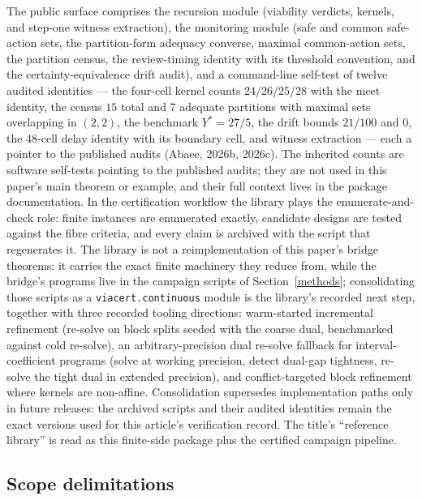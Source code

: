 \documentclass[10pt,twocolumn]{article}
\theoremstyle{plain}
\theoremstyle{definition}
\theoremstyle{remark}
\begin{document}
The public surface comprises the recursion module (viability verdicts,
kernels, and step-one witness extraction), the monitoring module (safe and
common safe-action sets, the partition-form adequacy converse, maximal
common-action sets, the partition census, the review-timing identity with
its threshold convention, and the certainty-equivalence drift audit), and a
command-line self-test of twelve audited identities --- the four-cell kernel
counts \(24/26/25/28\) with the meet identity, the census \(15\) total and
\(7\) adequate partitions with maximal sets overlapping in \((2,2)\), the
benchmark \(Y^{*} = 27/5\), the drift bounds \(21/100\) and \(0\), the
48-cell delay identity with its boundary cell, and witness extraction ---
each a pointer to the published audits (Abaee, 2026b, 2026c). The
inherited counts are software self-tests pointing to the published audits;
they are not used in this paper's main theorem or example, and their full
context lives in the package documentation. In the certification workflow
the library plays the enumerate-and-check role:
finite instances are enumerated exactly, candidate designs are tested
against the fibre criteria, and every claim is archived with the script that
regenerates it. The library is not a reimplementation of this paper's bridge theorems: it carries the exact finite machinery they reduce from, while the bridge's programs live in the campaign scripts of Section~\ref{methods}; consolidating those scripts as a \texttt{viacert.continuous} module is the library's recorded next step, together with three recorded tooling directions: warm-started incremental refinement (re-solve on block splits seeded with the coarse dual, benchmarked against cold re-solve), an arbitrary-precision dual re-solve fallback for interval-coefficient programs (solve at working precision, detect dual-gap tightness, re-solve the tight dual in extended precision), and conflict-targeted block refinement where kernels are non-affine. Consolidation supersedes implementation paths only in future releases:
the archived scripts and their audited identities remain the exact versions
used for this article's verification record. The title's ``reference
library'' is read as this finite-side package plus the certified campaign
pipeline.

\subsection{Scope delimitations}\label{scope}
\end{document}
